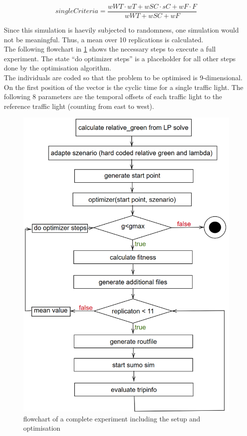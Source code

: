 \documentclass[./\jobname.tex]{subfiles}
\begin{document}
\begin{equation}
singleCriteria = \frac{wWT \cdot wT + wSC \cdot sC + wF \cdot F}{wWT + wSC + wF}
\label{eq:singleCrit}
\end{equation}

Since this simulation is haevily subjected to randomness, one simulation would not be meaningful. Thus, a mean over 10 replications is calculated. \\

The following flowchart in \ref{fig:simulation_flowchart} shows the necessary steps to execute a full experiment. The state ``do optimizer steps'' is a placeholder for all other steps done by the optimisation algorithm. \\

The individuals are coded so that the problem to be optimised is 9-dimensional. On the first position of the vector is the cyclic time for a single traffic light. The following 8 parameters are the temporal offsets of each traffic light to the reference traffic light (counting from east to west).  

\begin{figure}[H]
	\centering
	\includegraphics[width=\linewidth]{../img/png/simulation_flowchart.png}
	\caption{flowchart of a complete experiment including the setup and optimisation}
	\label{fig:simulation_flowchart}
\end{figure}
\end{document}
